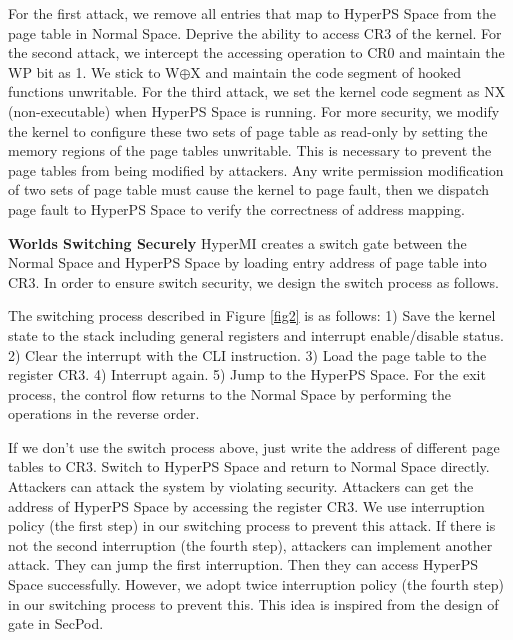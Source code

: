For the first attack, %
we remove all entries that map to HyperPS Space from the page table in Normal Space. Deprive the ability to access CR3 of the kernel. %
For the second attack, we intercept the accessing operation to CR0 and maintain the WP bit as 1. We stick to W$\oplus${X} and maintain the code segment of hooked functions unwritable.
For the third attack, we set the kernel code segment as NX (non-executable) when HyperPS Space is running. For more security, we modify the kernel to configure these two sets of page table as read-only by setting the memory regions of the page tables unwritable. This is necessary to prevent the page tables from being modified by attackers. Any write permission modification of two sets of page table must cause the kernel to page fault, then we dispatch page fault to HyperPS Space to verify the correctness of address mapping. 


\textbf{Worlds Switching Securely}
HyperMI creates a switch gate between the Normal Space and HyperPS Space by loading entry address of page table into CR3.
In order to ensure switch security, we design the switch process as follows.

The switching process described in Figure \ref{fig2} is as follows: 1) Save the kernel state to the stack including general registers and interrupt enable/disable status. 2) Clear the interrupt with the CLI instruction. 3) Load the page table to the register CR3. 4) Interrupt again. 5) Jump to the HyperPS Space. For the exit process, the control flow returns to the Normal Space by performing the operations in the reverse order.

\iffalse
If we don't use the switch process above, just write the address of different page tables to CR3. Switch to HyperPS Space and return to Normal Space directly. Attackers can attack the system by violating security. Attackers can get the address of HyperPS Space by accessing the register CR3. We use interruption policy (the first step) in our switching process to prevent this attack. 
If there is not the second interruption (the fourth step), attackers can implement another attack. They can jump the first interruption.
Then they can access HyperPS Space successfully. 
However, we adopt twice interruption policy (the fourth step) in our switching process to prevent this. 
This idea is inspired from the design of gate in SecPod\cite{Wang2015SecPod}.

